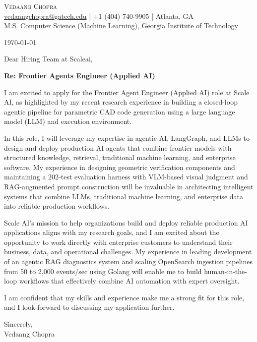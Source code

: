 \documentclass[letterpaper,11pt]{article}
\newcommand{\letterPara}[1]{\noindent #1 \vspace{10pt}}
\begin{document}
\begin{center}
  {\LARGE \scshape Vedaang Chopra} \\ \vspace{4pt}
  \small \href{mailto:vedaangchopra@gatech.edu}{vedaangchopra@gatech.edu} \;|\; +1 (404) 740-9905 \;|\; Atlanta, GA \\ \vspace{2pt}
  \small M.S. Computer Science (Machine Learning), Georgia Institute of Technology
\end{center}
\vspace{-8pt}

\hfill \small \today

\noindent Dear Hiring Team at Scaleai,

\noindent \textbf{Re: Frontier Agents Engineer (Applied AI)}

\letterPara{I am excited to apply for the Frontier Agent Engineer (Applied AI) role at Scale AI, as highlighted by my recent research experience in building a closed-loop agentic pipeline for parametric CAD code generation using a large language model (LLM) and execution environment.}

\letterPara{In this role, I will leverage my expertise in agentic AI, LangGraph, and LLMs to design and deploy production AI agents that combine frontier models with structured knowledge, retrieval, traditional machine learning, and enterprise software. My experience in designing geometric verification components and maintaining a 202-test evaluation harness with VLM-based visual judgment and RAG-augmented prompt construction will be invaluable in architecting intelligent systems that combine LLMs, traditional machine learning, and enterprise data into reliable production workflows.}

\letterPara{Scale AI's mission to help organizations build and deploy reliable production AI applications aligns with my research goals, and I am excited about the opportunity to work directly with enterprise customers to understand their business, data, and operational challenges. My experience in leading development of an agentic RAG diagnostics system and scaling OpenSearch ingestion pipelines from 50 to 2,000 events/sec using Golang will enable me to build human-in-the-loop workflows that effectively combine AI automation with expert oversight.}

\letterPara{I am confident that my skills and experience make me a strong fit for this role, and I look forward to discussing my application further.}

\noindent Sincerely,\\[4pt] Vedaang Chopra
\end{document}
